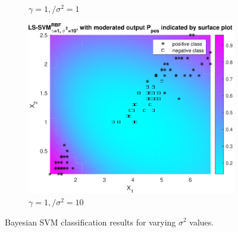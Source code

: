 \documentclass{article}
\begin{document}
\begin{figure}[h]
\begin{subfigure}[b]{0.3\textwidth}
                    \caption{$\gamma = 1,/ \sigma^2 = 1$}
                     \label{fig:bayes_2}
                 \end{subfigure}
                 \hfill
                 \begin{subfigure}[b]{0.3\textwidth}
                     \centering
                     \includegraphics[width=\textwidth]{Assignment 1/figures/bayes_rbf_gamma_1_sig2_10.pdf}
                    \caption{$\gamma = 1,/ \sigma^2 = 10$}
                     \label{fig:bayes_3}
                 \end{subfigure}
                \caption{Bayesian SVM classification results for varying $\sigma^2$ values.}
            \end{figure}
            
\end{document}
